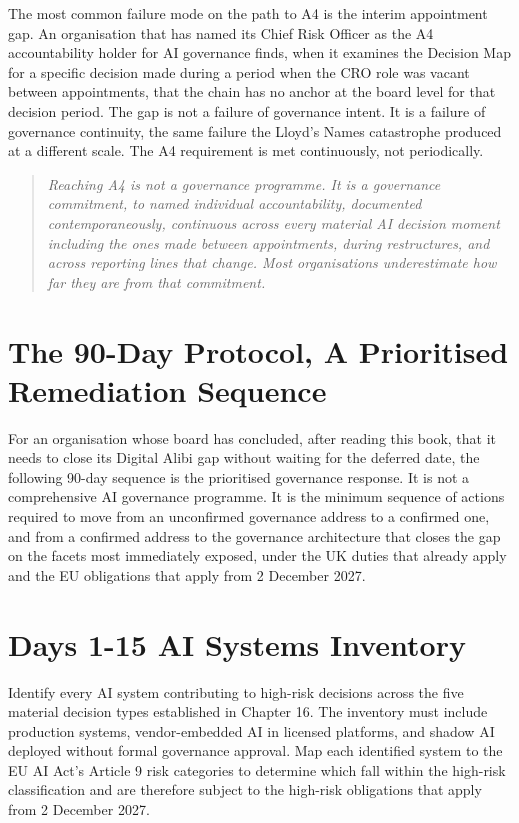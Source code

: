 The most common failure mode on the path to A4 is the interim appointment gap. An organisation that has named its Chief Risk Officer as the A4 accountability holder for AI governance finds, when it examines the Decision Map for a specific decision made during a period when the CRO role was vacant between appointments, that the chain has no anchor at the board level for that decision period. The gap is not a failure of governance intent. It is a failure of governance continuity, the same failure the Lloyd's Names catastrophe produced at a different scale. The A4 requirement is met continuously, not periodically.

\begin{quote}
\emph{Reaching A4 is not a governance programme. It is a governance commitment, to named individual accountability, documented contemporaneously, continuous across every material AI decision moment including the ones made between appointments, during restructures, and across reporting lines that change. Most organisations underestimate how far they are from that commitment.}
\end{quote}

\scenebreak

\section{The 90-Day Protocol, A Prioritised Remediation Sequence}

For an organisation whose board has concluded, after reading this book, that it needs to close its Digital Alibi gap without waiting for the deferred date, the following 90-day sequence is the prioritised governance response. It is not a comprehensive AI governance programme. It is the minimum sequence of actions required to move from an unconfirmed governance address to a confirmed one, and from a confirmed address to the governance architecture that closes the gap on the facets most immediately exposed, under the UK duties that already apply and the EU obligations that apply from 2 December 2027.

\section{Days 1-15 AI Systems Inventory}

Identify every AI system contributing to high-risk decisions across the five material decision types established in Chapter 16. The inventory must include production systems, vendor-embedded AI in licensed platforms, and shadow AI deployed without formal governance approval. Map each identified system to the EU AI Act's Article 9 risk categories to determine which fall within the high-risk classification and are therefore subject to the high-risk obligations that apply from 2 December 2027.

